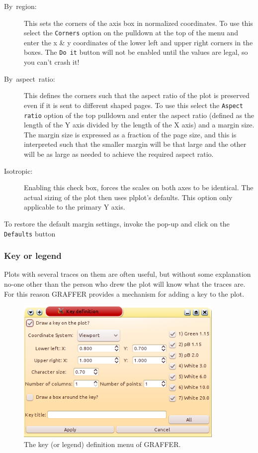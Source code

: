 \documentclass[11pt,twoside,english]{article}
\begin{document}
\begin{description}
\item [By~region:]This sets the corners of the axis box in normalized
  coordinates. To use this select the \texttt{Corners} option on the
  pulldown at the top of the menu and enter the x \& y coordinates of
  the lower left and upper right corners in the boxes. The \texttt{Do
    it} button will not be enabled until the values are legal, so you
  can't crash it!
\item [By~aspect~ratio:]This 
  defines the corners such that the aspect ratio of the plot is
  preserved even if it is sent to different shaped pages. To use this
  select the \texttt{Aspect ratio} option of the top pulldown and enter
  the aspect ratio (defined as the length of the Y axis divided by the
  length of the X axis) and a margin size. The margin size is expressed
  as a fraction of the page size, and this is interpreted such that the
  smaller margin will be that large and the other will be as large as
  needed to achieve the required aspect ratio.
\item[Isotropic:] Enabling this check box, forces the scales on both
  axes to be identical. The actual sizing of the plot then uses plplot's
  defaults. This option only applicable to the primary Y axis.
\end{description}
To restore the default margin settings, invoke the pop-up and click on
the \texttt{Defaults} button


\subsubsection{Key or legend}

Plots with several traces on them are often useful, but without some
explanation no-one other than the person who drew the plot will know
what the traces are. For this reason GRAFFER provides a mechanism for
adding a key to the plot.
\begin{figure}[htbp]
  \centering
  \includegraphics[width=10cm]{key}
  \caption{The key (or legend) definition menu of GRAFFER.}
  \label{key menu}
\end{figure}
\end{document}
